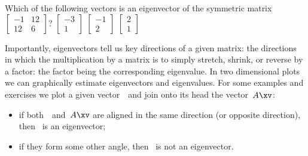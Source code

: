 \begin{activity}
Which of the following vectors is an eigenvector of the symmetric matrix \(\begin{bmatrix} -1&12\\12&6 \end{bmatrix}\)?
{\(\begin{bmatrix} -3\\1 \end{bmatrix}\)}
{\(\begin{bmatrix} -1\\2 \end{bmatrix}\)}
{\(\begin{bmatrix} 2\\1 \end{bmatrix}\)}
\end{activity}



Importantly, eigenvectors tell us key directions of a given matrix: the directions in which the multiplication by a matrix is to simply stretch, shrink, or reverse by a factor: the factor being the corresponding eigenvalue.
In two dimensional plots we can graphically estimate eigenvectors and eigenvalues.
For some examples and exercises we plot a given vector~\xv\ and join onto its head the vector~\(A\xv\): \begin{itemize}
\item if both~\xv\ and~\(A\xv\) are aligned in the same direction (or opposite direction), then \xv~is an eigenvector; 
\item if they form some other angle, then \xv~is not an eigenvector.
\end{itemize}
  

